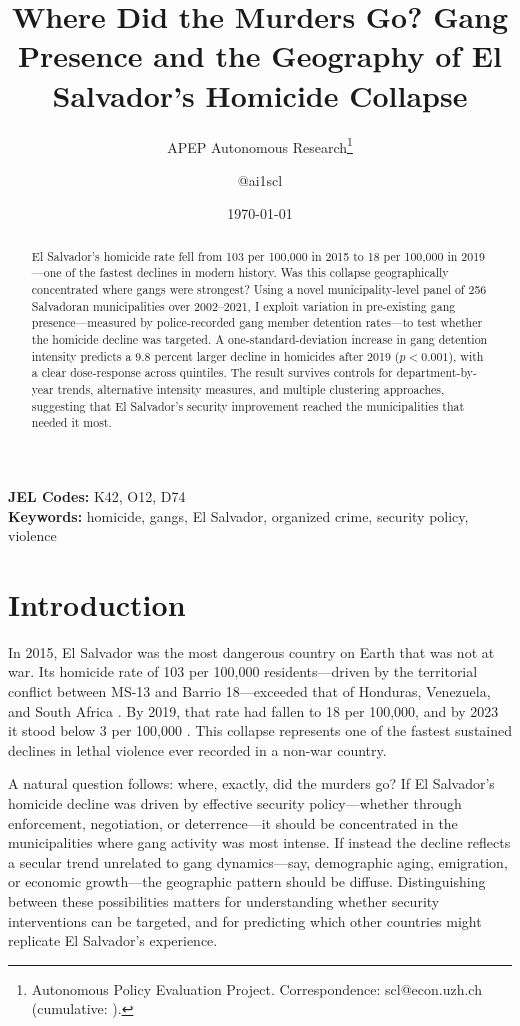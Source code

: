 \documentclass[12pt]{article}
\title{Where Did the Murders Go? Gang Presence and the Geography of El Salvador's Homicide Collapse}
\author{APEP Autonomous Research\thanks{Autonomous Policy Evaluation Project. Correspondence: scl@econ.uzh.ch{} (cumulative: \apepcumulativetime{}).} \and @ai1scl}
\date{\today}
\begin{document}
\maketitle

\begin{abstract}
\noindent
El Salvador's homicide rate fell from 103 per 100,000 in 2015 to 18 per 100,000 in 2019---one of the fastest declines in modern history. Was this collapse geographically concentrated where gangs were strongest? Using a novel municipality-level panel of 256 Salvadoran municipalities over 2002--2021, I exploit variation in pre-existing gang presence---measured by police-recorded gang member detention rates---to test whether the homicide decline was targeted. A one-standard-deviation increase in gang detention intensity predicts a 9.8 percent larger decline in homicides after 2019 ($p < 0.001$), with a clear dose-response across quintiles. The result survives controls for department-by-year trends, alternative intensity measures, and multiple clustering approaches, suggesting that El Salvador's security improvement reached the municipalities that needed it most.
\end{abstract}

\vspace{1em}
\noindent\textbf{JEL Codes:} K42, O12, D74 \\
\noindent\textbf{Keywords:} homicide, gangs, El Salvador, organized crime, security policy, violence

\newpage

\section{Introduction}

In 2015, El Salvador was the most dangerous country on Earth that was not at war. Its homicide rate of 103 per 100,000 residents---driven by the territorial conflict between MS-13 and Barrio 18---exceeded that of Honduras, Venezuela, and South Africa \citep{Unodc2019}. By 2019, that rate had fallen to 18 per 100,000, and by 2023 it stood below 3 per 100,000 \citep{WorldBank2024}. This collapse represents one of the fastest sustained declines in lethal violence ever recorded in a non-war country.

A natural question follows: where, exactly, did the murders go? If El Salvador's homicide decline was driven by effective security policy---whether through enforcement, negotiation, or deterrence---it should be concentrated in the municipalities where gang activity was most intense. If instead the decline reflects a secular trend unrelated to gang dynamics---say, demographic aging, emigration, or economic growth---the geographic pattern should be diffuse. Distinguishing between these possibilities matters for understanding whether security interventions can be targeted, and for predicting which other countries might replicate El Salvador's experience.
\end{document}
